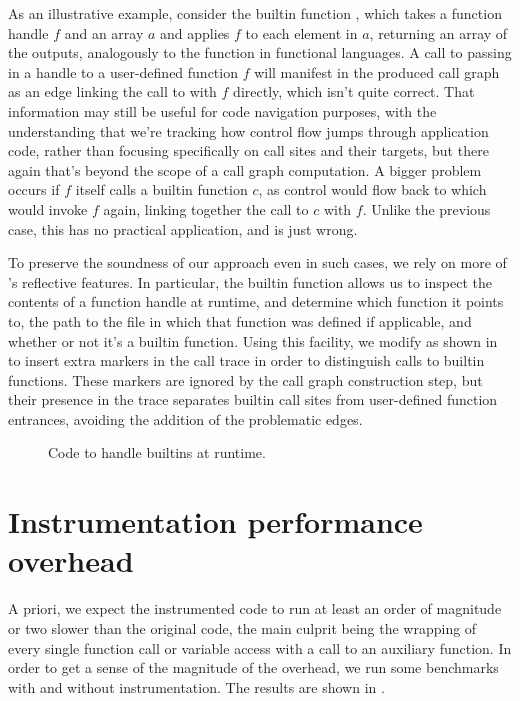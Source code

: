 As an illustrative example, consider the builtin function ,
which takes a function handle $f$ and an array $a$ and applies $f$ to each
element in $a$, returning an array of the outputs, analogously to the
 function in functional languages. A call to  passing
in a handle to a user-defined function $f$ will manifest in the produced call
graph as an edge linking the call to  with $f$ directly, which
isn't quite correct. That information may still be useful for code navigation
purposes, with the understanding that we're tracking how control flow jumps
through application code, rather than focusing specifically on call sites and
their targets, but there again that's beyond the scope of a call graph
computation. A bigger problem occurs if $f$ itself calls a builtin function
$c$, as control would flow back to  which would invoke $f$
again, linking together the call to $c$ with $f$. Unlike the previous case,
this has no practical application, and is just wrong.

To preserve the soundness of our approach even in such cases, we rely on more
of \matlab's reflective features. In particular, the  builtin
function allows us to inspect the contents of a function handle at runtime, and
determine which function it points to, the path to the file in which that
function was defined if applicable, and whether or not it's a builtin function.
Using this facility, we modify  as shown
in  to insert extra markers in the call trace in
order to distinguish calls to builtin functions. These markers are ignored by
the call graph construction step, but their presence in the trace separates
builtin call sites from user-defined function entrances, avoiding the addition
of the problematic edges.

\begin{figure}[htbp]
  
\caption{Code to handle builtins at runtime.}
\label{Fig:LogThenRunBuiltin}
\end{figure}


\section{Instrumentation performance overhead}

A priori, we expect the instrumented code to run at least an order of magnitude
or two slower than the original code, the main culprit being the wrapping of
every single function call or variable access with a call to an auxiliary
function. In order to get a sense of the magnitude of the overhead, we run some
benchmarks with and without instrumentation. The results are shown in
.

